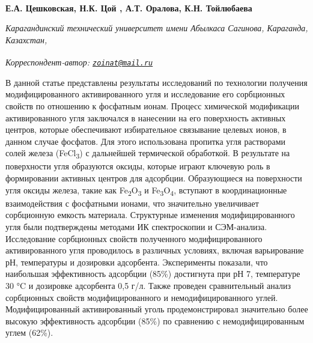 
\begin{articleheader}

{\bfseries
Е.А. Цешковская\authorid,
Н.К. Цой\textsuperscript{\envelope } \authorid,
А.Т. Оралова\authorid,
К.Н. Тойлюбаева\authorid}
\end{articleheader}

\begin{affiliation}
\emph{Карагандинский технический университет имени Абылкаса Сагинова, Караганда, Казахстан,}

\raggedright \textsuperscript{\envelope }{\em Корреспондент-автор: \href{mailto:zoinat@mail.ru}{\nolinkurl{zoinat@mail.ru}}}
\end{affiliation}

В данной статье представлены результаты исследований по технологии
получения модифицированного активированного угля и исследование его
сорбционных свойств по отношению к фосфатным ионам. Процесс химической
модификации активированного угля заключался в нанесении на его
поверхность активных центров, которые обеспечивают избирательное
связывание целевых ионов, в данном случае фосфатов. Для этого
использована пропитка угля растворами солей железа
(FeCl\textsubscript{3}) с дальнейшей термической обработкой. В
результате на поверхности угля образуются оксиды, которые играют
ключевую роль в формировании активных центров для адсорбции.
Образующиеся на поверхности угля оксиды железа, такие как
Fe\textsubscript{2}O\textsubscript{3} и
Fe\textsubscript{3}O\textsubscript{4}, вступают в координационные
взаимодействия с фосфатными ионами, что значительно увеличивает
сорбционную емкость материала. Структурные изменения модифицированного
угля были подтверждены методами ИК спектроскопии и СЭМ-анализа.
Исследование сорбционных свойств полученного модифицированного
активированного угля проводилось в различных условиях, включая
варьирование рН, температуры и дозировки адсорбента. Эксперименты
показали, что наибольшая эффективность адсорбции (85\%) достигнута при
рН 7, температуре 30 °C и дозировке адсорбента 0,5 г/л. Также проведен
сравнительный анализ сорбционных свойств модифицированного и
немодифицированного углей. Модифицированный активированный уголь
продемонстрировал значительно более высокую эффективность адсорбции
(85\%) по сравнению с немодифицированным углем (62\%).

